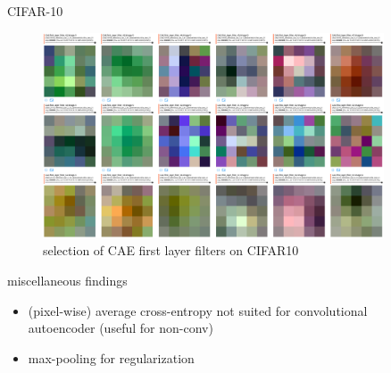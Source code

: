 \documentclass[final]{beamer}
\newlength{\sepwid}
\newlength{\onecolwid}
\newlength{\twocolwid}
\begin{document}
\begin{frame}[t]
\begin{columns}[t]
\begin{column}{\onecolwid}
\begin{block}{CIFAR-10}
\begin{figure}
\includegraphics[width=0.8\linewidth]{graphics/cifar_filters.png}
\caption{selection of CAE first layer filters on CIFAR10}
\end{figure}

\end{block}


\begin{alertblock}{miscellaneous findings}
\begin{itemize}
	\item (pixel-wise) average cross-entropy not suited for convolutional autoencoder (useful for non-conv)
	\item max-pooling for regularization 
\end{itemize}
\end{alertblock}


\end{column} %



\begin{column}{\sepwid}\end{column} %

\begin{column}{\onecolwid} %




\end{column}
\end{columns}
\end{frame}
\end{document}
